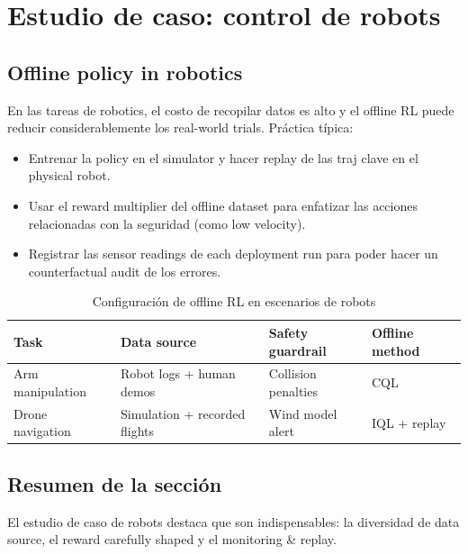 \section{Estudio de caso: control de robots}

\subsection{Offline policy in robotics}

En las tareas de robotics, el costo de recopilar datos es alto y el offline RL puede reducir considerablemente los real-world trials. Práctica típica:

\begin{itemize}
    \item Entrenar la policy en el simulator y hacer replay de las traj clave en el physical robot.
    \item Usar el reward multiplier del offline dataset para enfatizar las acciones relacionadas con la seguridad (como low velocity).
    \item Registrar las sensor readings de each deployment run para poder hacer un counterfactual audit de los errores.
\end{itemize}

\begin{table}[H]
\centering
\begin{tabular}{p{} p{} p{} p{}}
\toprule
Task & Data source & Safety guardrail & Offline method \\
\midrule
Arm manipulation & Robot logs + human demos & Collision penalties & CQL \\
Drone navigation & Simulation + recorded flights & Wind model alert & IQL + replay \\
\bottomrule
\end{tabular}
\caption{Configuración de offline RL en escenarios de robots}
\end{table}

\subsection{Resumen de la sección}

El estudio de caso de robots destaca que son indispensables: la diversidad de data source, el reward carefully shaped y el monitoring & replay.


